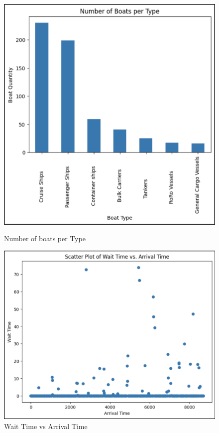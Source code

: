 \documentclass[12pt]{article}
\begin{document}
    \begin{figure}[H]
    \centering
    \begin{minipage}{0.5\textwidth}
        \centering
        \includegraphics[width=\linewidth]{SIMUlACION 2.1.png}  
        \caption{Number of boats per Type}
        \label{fig:grafica1}
    \end{minipage}\hfill
    \begin{minipage}{0.5\textwidth}
        \centering
        \includegraphics[width=\linewidth]{SIMULACION 2.png}  
        \caption{Wait Time vs Arrival Time}
        \label{fig:grafica2}
    \end{minipage}
    \end{figure}
\end{document}
